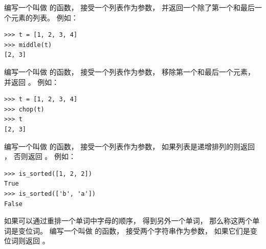 \begin{exercise}


编写一个叫做 {\em {}} 的函数， 接受一个列表作为参数， 并返回一个除了第一个和最后一个元素的列表。
例如：

\begin{em}
\begin{lstlisting}
>>> t = [1, 2, 3, 4]
>>> middle(t)
[2, 3]
\end{lstlisting}
\end{em}

\end{exercise}

\begin{exercise}


编写一个叫做 {\em {}} 的函数， 接受一个列表作为参数， 移除第一个和最后一个元素， 并返回 {\em {}}。
例如：

\begin{em}
\begin{lstlisting}
>>> t = [1, 2, 3, 4]
>>> chop(t)
>>> t
[2, 3]
\end{lstlisting}
\end{em}

\end{exercise}


\begin{exercise}

编写一个叫做 {\em {}} 的函数， 接受一个列表作为参数，
如果列表是递增排列的则返回 {\em {}} ， 否则返回 {\em {}}。
例如：

\begin{em}
\begin{lstlisting}
>>> is_sorted([1, 2, 2])
True
>>> is_sorted(['b', 'a'])
False
\end{lstlisting}
\end{em}

\end{exercise}


\begin{exercise}
\label{anagram}



如果可以通过重排一个单词中字母的顺序， 得到另外一个单词， 那么称这两个单词是变位词。
编写一个叫做 {\em {}} 的函数， 接受两个字符串作为参数，
如果它们是变位词则返回 {\em {}} 。
\end{exercise}



